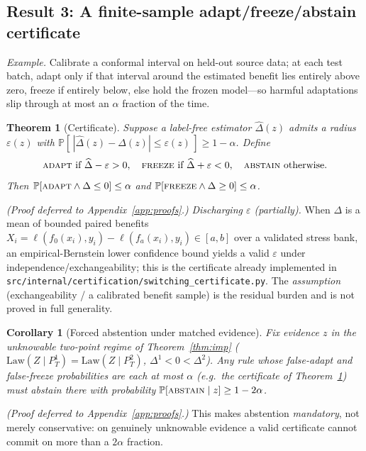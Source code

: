 \documentclass[11pt]{article}
\theoremstyle{plain}
\newtheorem{theorem}{Theorem}
\newtheorem{corollary}{Corollary}
\theoremstyle{definition}
\renewcommand{\Pr}{\mathbb{P}}
\newcommand{\Law}{\mathrm{Law}}
\begin{document}
\subsection{Result 3: A finite-sample adapt/freeze/abstain certificate}\label{sec:cert}
\noindent\emph{Example.} Calibrate a conformal interval on held-out source data; at each test
batch, adapt only if that interval around the estimated benefit lies entirely above zero, freeze
if entirely below, else hold the frozen model---so harmful adaptations slip through at most an
$\alpha$ fraction of the time.
\begin{theorem}[Certificate]\label{thm:cert}
Suppose a label-free estimator $\widehat\Delta(z)$ admits a radius $\varepsilon(z)$ with
$\Pr[\,|\widehat\Delta(z)-\Delta(z)|\le \varepsilon(z)\,]\ge 1-\alpha$. Define
\[
\textsc{adapt}\ \text{if}\ \widehat\Delta-\varepsilon>0,\quad
\textsc{freeze}\ \text{if}\ \widehat\Delta+\varepsilon<0,\quad
\textsc{abstain}\ \text{otherwise.}
\]
Then $\Pr[\textsc{adapt}\wedge \Delta\le 0]\le\alpha$ and
$\Pr[\textsc{freeze}\wedge \Delta\ge 0]\le\alpha$.
\end{theorem}
\emph{(Proof deferred to Appendix~\ref{app:proofs}.)}
\noindent\emph{Discharging $\varepsilon$ (partially).} When $\Delta$ is a mean of
bounded paired benefits $X_i=\ell(f_0(x_i),y_i)-\ell(f_a(x_i),y_i)\in[a,b]$ over a
validated stress bank, an empirical-Bernstein lower confidence bound yields a valid
$\varepsilon$ under independence/exchangeability; this is the certificate already
implemented in \texttt{src/internal/certification/switching\_certificate.py}. The
\emph{assumption} (exchangeability / a calibrated benefit sample) is the residual
burden and is not proved in full generality.

\begin{corollary}[Forced abstention under matched evidence]\label{cor:forced-abstain}
Fix evidence $z$ in the unknowable two-point regime of Theorem~\ref{thm:imp}
($\Law(Z\mid P_T^1)=\Law(Z\mid P_T^2)$, $\Delta^1<0<\Delta^2$). Any rule whose
false-adapt and false-freeze probabilities are each at most $\alpha$ (e.g.\ the
certificate of Theorem~\ref{thm:cert}) must abstain there with probability
$\Pr[\textsc{abstain}\mid z]\ge 1-2\alpha$.
\end{corollary}
\emph{(Proof deferred to Appendix~\ref{app:proofs}.)}
\noindent This makes abstention \emph{mandatory}, not merely conservative: on genuinely
unknowable evidence a valid certificate cannot commit on more than a $2\alpha$ fraction.
\end{document}
